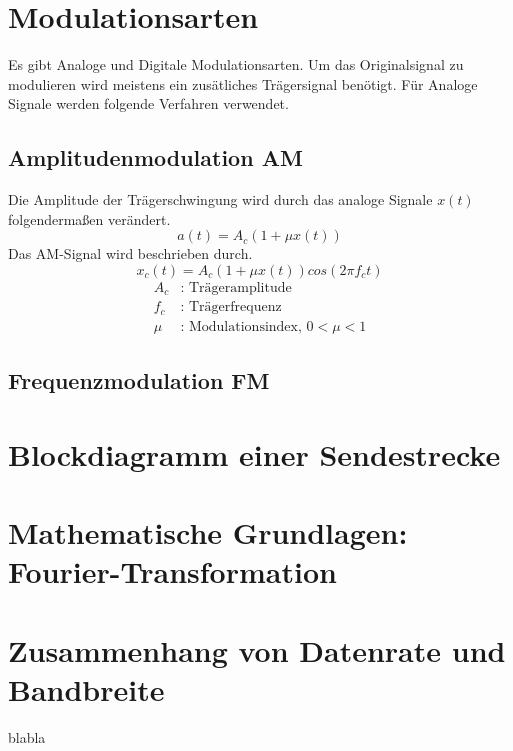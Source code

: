 \section{Modulationsarten}
Es gibt Analoge und Digitale Modulationsarten.
Um das Originalsignal zu modulieren wird meistens ein zusätliches Trägersignal benötigt.
Für Analoge Signale werden folgende Verfahren verwendet.

\subsection{Amplitudenmodulation AM}
Die Amplitude der Trägerschwingung wird durch das analoge Signale
$x(t)$ folgendermaßen verändert.
\begin{equation}
    a(t)=A_c(1+\mu x(t))
\end{equation}
Das AM-Signal wird beschrieben durch.
\begin{equation}
    x_c(t)=A_c(1+\mu x(t))cos(2\pi f_c t)
\end{equation}
\begin{align}
    A_c &\text{: Trägeramplitude} \\
    f_c &\text{: Trägerfrequenz} \\
    \mu &\text{: Modulationsindex, } 0 < \mu < 1
\end{align}


\subsection{Frequenzmodulation FM}

\section{Blockdiagramm einer Sendestrecke}
\section{Mathematische Grundlagen: Fourier-Transformation}
\section{Zusammenhang von Datenrate und Bandbreite}
blabla
\clearpage